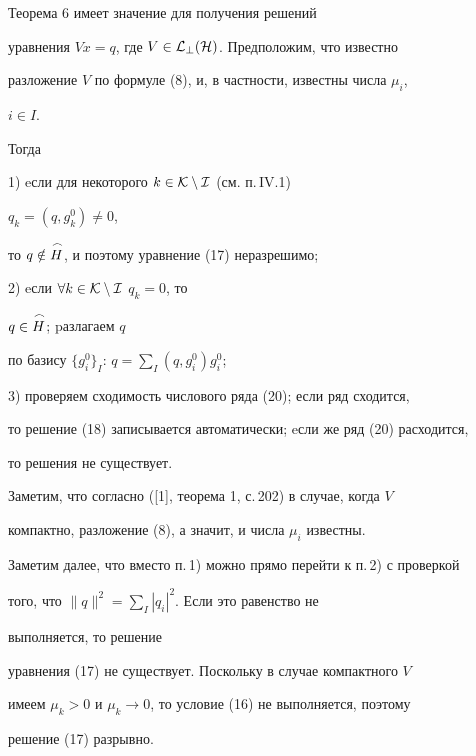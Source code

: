\begin{note} 


Теорема 6 имеет значение для получения решений 


уравнения $V x=q$, где $V\in\cal L_\bot(H)$. Предположим, что известно 


разложение $V$ по формуле (8), и, в частности, известны числа $\mu_i$, 


$i\in I$. 


Тогда 


 


1) eсли для некоторого $k\in\cal K\setminus I$ (см. п.\,IV.1) 


$q_k=(q,g^0_k)\ne0$, 


то $q\notin\overset{\,\frown}{H}{}$, и поэтому уравнение (17) неразрешимо; 


 


2) eсли $\forall k\in\cal K\setminus I$ $q_k=0$, то 


$q\in\overset{\,\frown}{H}{}$; pазлагаем $q$ 


по базису $\{g^0_i\}_I$: $q=\sum\limits_I(q,g^0_i)g^0_i$; 


 


3) проверяем сходимость числового ряда (20); если ряд сходится, 


то решение (18) записывается автоматически; eсли же ряд (20) расходится, 


то решения не существует. 


\end{note} 


 


Заметим, что согласно ([1], теорема 1, с.\,202) в случае, когда $V$ 


компактно, разложение (8), а значит, и числа $\mu_i$ известны. 


Заметим далее, что вместо п.\,1) можно прямо перейти к п.\,2) с проверкой 


того, что $\|q\|^2=\sum\limits_I|q_i|^2$. Если это равенство не 


выполняется, то решение 


уравнения (17) не существует. Поскольку в случае компактного $V$ 


имеем $\mu_k>0$ и $\mu_k\to0$, то условие (16) не выполняется, поэтому 


решение (17) разрывно. 


